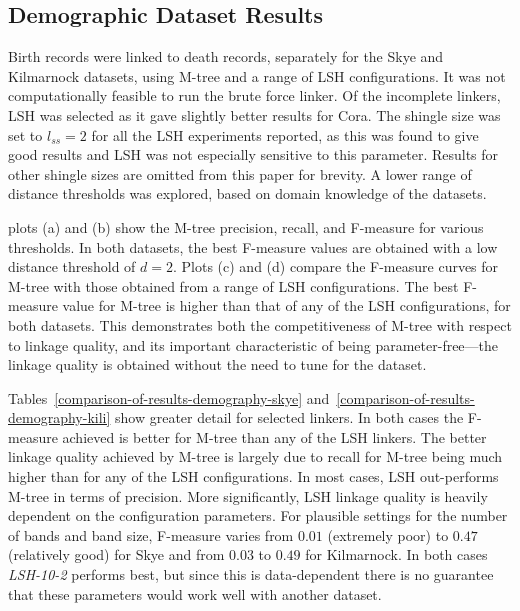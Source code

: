 \documentclass{llncs}
\begin{document}

\subsection{Demographic Dataset Results}

Birth records were linked to death records, separately for the Skye and
Kilmarnock datasets, using M-tree and a range of LSH configurations. It
was not computationally feasible to run the brute force linker. Of the
incomplete linkers, LSH was selected as it gave slightly better results
for Cora. The shingle size was set to $l_{ss}=2$ for all the LSH
experiments reported, as this was found to give good results and LSH
was not especially sensitive to this parameter. Results for other
shingle sizes are omitted from this paper for brevity. A lower range
of distance thresholds was explored, based on domain knowledge of the
datasets.

 plots (a) and (b) show the M-tree precision,
recall, and F-measure for various thresholds. In both datasets, the best
F-measure values are obtained with a low distance threshold of $d=2$.
Plots (c) and (d) compare the F-measure curves for M-tree with those
obtained from a range of LSH configurations. The best F-measure value
for M-tree is higher than that of any of the LSH configurations, for
both datasets. This demonstrates both the competitiveness of M-tree
with respect to linkage quality, and its important characteristic of
being parameter-free---the linkage quality is obtained without the
need to tune for the dataset.

Tables~\ref{comparison-of-results-demography-skye}
and~\ref{comparison-of-results-demography-kili} show greater detail for
selected linkers. In both cases the F-measure achieved is better for
M-tree than any of the LSH linkers. The better linkage quality achieved
by M-tree is largely due to recall for M-tree being much higher than for
any of the LSH configurations. In most cases, LSH out-performs M-tree in
terms of precision. More significantly, LSH linkage quality is heavily
dependent on the configuration parameters. For plausible settings for
the number of bands and band size, F-measure varies from $0.01$
(extremely poor) to $0.47$ (relatively good) for Skye and from $0.03$
to $0.49$ for Kilmarnock. In both cases \emph{LSH-10-2} performs best,
but since this is data-dependent there is no guarantee that these
parameters would work well with another dataset.
\end{document}
